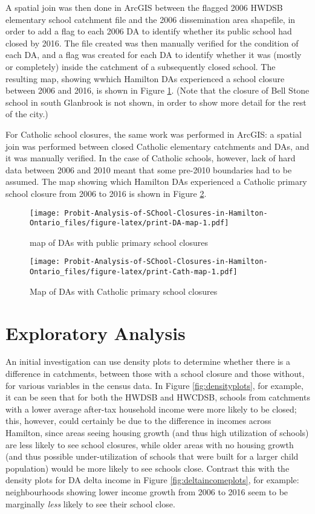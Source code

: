 \documentclass[]{elsarticle} %
\makeatletter
\def\maxwidth{\ifdim\Gin@nat@width>\linewidth\linewidth
\else\Gin@nat@width\fi}
\let\Oldincludegraphics\includegraphics
\renewcommand{\includegraphics}[1]{\Oldincludegraphics[width=\maxwidth]{#1}}
\makeatother
\begin{document}
A spatial join was then done in ArcGIS between the flagged 2006 HWDSB
elementary school catchment file and the 2006 dissemination area
shapefile, in order to add a flag to each 2006 DA to identify whether
its public school had closed by 2016. The file created was then manually
verified for the condition of each DA, and a flag was created for each
DA to identify whether it was (mostly or completely) inside the
catchment of a subsequently closed school. The resulting map, showing
wwhich Hamilton DAs experienced a school closure between 2006 and 2016,
is shown in Figure \ref{fig:DA-map}. (Note that the closure of Bell
Stone school in south Glanbrook is not shown, in order to show more
detail for the rest of the city.)

For Catholic school closures, the same work was performed in ArcGIS: a
spatial join was performed between closed Catholic elementary catchments
and DAs, and it was manually verified. In the case of Catholic schools,
however, lack of hard data between 2006 and 2010 meant that some
pre-2010 boundaries had to be assumed. The map showing which Hamilton
DAs experienced a Catholic primary school closure from 2006 to 2016 is
shown in Figure \ref{fig:Cath-map}.

\begin{figure}
\centering
\texttt{[image: Probit-Analysis-of-SChool-Closures-in-Hamilton-Ontario\_files/figure-latex/print-DA-map-1.pdf]}
\caption{\label{fig:DA-map} map of DAs with public primary school
closures}
\end{figure}

\begin{figure}
\centering
\texttt{[image: Probit-Analysis-of-SChool-Closures-in-Hamilton-Ontario\_files/figure-latex/print-Cath-map-1.pdf]}
\caption{\label{fig:Cath-map} Map of DAs with Catholic primary school
closures}
\end{figure}

\hypertarget{exploratory-analysis}{%
\section{Exploratory Analysis}\label{exploratory-analysis}}

An initial investigation can use density plots to determine whether
there is a difference in catchments, between those with a school closure
and those without, for various variables in the census data. In Figure
\ref{fig:densityplots}, for example, it can be seen that for both the
HWDSB and HWCDSB, schools from catchments with a lower average after-tax
household income were more likely to be closed; this, however, could
certainly be due to the difference in incomes across Hamilton, since
areas seeing housing growth (and thus high utilization of schools) are
less likely to see school closures, while older areas with no housing
growth (and thus possible under-utilization of schools that were built
for a larger child population) would be more likely to see schools
close. Contrast this with the density plots for DA delta income in
Figure \ref{fig:deltaincomeplots}, for example: neighbourhoods showing
lower income growth from 2006 to 2016 seem to be marginally \emph{less}
likely to see their school close.
\end{document}
